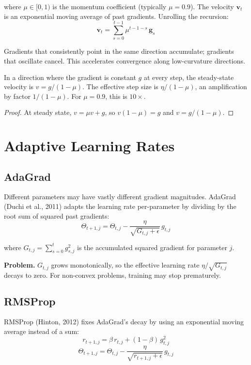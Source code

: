 \documentclass[main.tex]{subfiles}
\begin{document}
where $\mu \in [0,1)$ is the momentum coefficient (typically $\mu = 0.9$). The velocity $\mathbf{v}_t$ is an exponential moving average of past gradients. Unrolling the recursion:
$$\mathbf{v}_t = \sum_{s=0}^{t-1}\mu^{t-1-s}\,\mathbf{g}_s$$

Gradients that consistently point in the same direction accumulate; gradients that oscillate cancel. This accelerates convergence along low-curvature directions.

\begin{proposition}
In a direction where the gradient is constant $g$ at every step, the steady-state velocity is $v = g/(1-\mu)$. The effective step size is $\eta/(1-\mu)$, an amplification by factor $1/(1-\mu)$. For $\mu = 0.9$, this is $10\times$.
\end{proposition}

\begin{proof}
At steady state, $v = \mu v + g$, so $v(1-\mu) = g$ and $v = g/(1-\mu)$.
\end{proof}

\needspace{0.33\textheight}
\section{Adaptive Learning Rates}

\subsection{AdaGrad}

Different parameters may have vastly different gradient magnitudes. AdaGrad (Duchi et al., 2011) adapts the learning rate per-parameter by dividing by the root sum of squared past gradients:
$$\Theta_{t+1,j} = \Theta_{t,j} - \frac{\eta}{\sqrt{G_{t,j} + \epsilon}}\,g_{t,j}$$

where $G_{t,j} = \sum_{s=0}^{t}g_{s,j}^2$ is the accumulated squared gradient for parameter $j$.

\textbf{Problem.} $G_{t,j}$ grows monotonically, so the effective learning rate $\eta/\sqrt{G_{t,j}}$ decays to zero. For non-convex problems, training may stop prematurely.

\subsection{RMSProp}

RMSProp (Hinton, 2012) fixes AdaGrad's decay by using an exponential moving average instead of a sum:
$$r_{t+1,j} = \beta\,r_{t,j} + (1 - \beta)\,g_{t,j}^2$$
$$\Theta_{t+1,j} = \Theta_{t,j} - \frac{\eta}{\sqrt{r_{t+1,j} + \epsilon}}\,g_{t,j}$$
\end{document}
